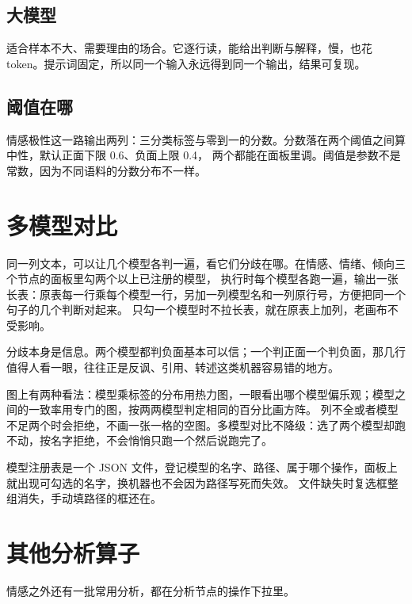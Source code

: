\subsection{大模型}

适合样本不大、需要理由的场合。它逐行读，能给出判断与解释，慢，也花 token。提示词固定，所以同一个输入永远得到同一个输出，结果可复现。

\subsection{阈值在哪}

情感极性这一路输出两列：三分类标签与零到一的分数。分数落在两个阈值之间算中性，默认正面下限 0.6、负面上限 0.4，
两个都能在面板里调。阈值是参数不是常数，因为不同语料的分数分布不一样。

\section{多模型对比}

同一列文本，可以让几个模型各判一遍，看它们分歧在哪。在情感、情绪、倾向三个节点的面板里勾两个以上已注册的模型，
执行时每个模型各跑一遍，输出一张长表：原表每一行乘每个模型一行，另加一列模型名和一列原行号，方便把同一个句子的几个判断对起来。
只勾一个模型时不拉长表，就在原表上加列，老画布不受影响。

分歧本身是信息。两个模型都判负面基本可以信；一个判正面一个判负面，那几行值得人看一眼，往往正是反讽、引用、转述这类机器容易错的地方。

图上有两种看法：模型乘标签的分布用热力图，一眼看出哪个模型偏乐观；模型之间的一致率用专门的图，按两两模型判定相同的百分比画方阵。
列不全或者模型不足两个时会拒绝，不画一张一格的空图。多模型对比不降级：选了两个模型却跑不动，按名字拒绝，不会悄悄只跑一个然后说跑完了。

模型注册表是一个 JSON 文件，登记模型的名字、路径、属于哪个操作，面板上就出现可勾选的名字，换机器也不会因为路径写死而失效。
文件缺失时复选框整组消失，手动填路径的框还在。

\section{其他分析算子}

情感之外还有一批常用分析，都在分析节点的操作下拉里。

